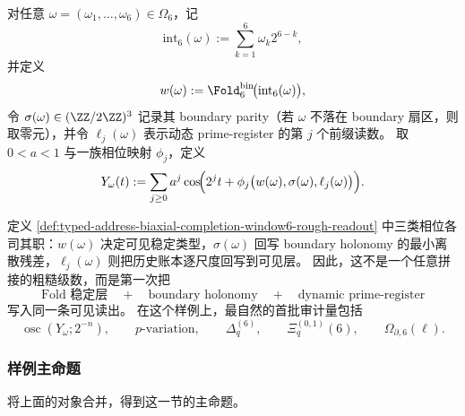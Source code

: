 \begin{definition}\label{def:typed-address-biaxial-completion-window6-rough-readout}
对任意 \(\omega=(\omega_1,\dots,\omega_6)\in\Omega_6\)，记
\[
\mathrm{int}_6(\omega):=\sum_{k=1}^{6}\omega_k2^{6-k},
\]
并定义
\[
w(\omega):=\Fold_6^{\mathrm{bin}}\!\bigl(\mathrm{int}_6(\omega)\bigr),
\]
令 \(\sigma(\omega)\in (\ZZ/2\ZZ)^3\) 记录其 boundary parity（若 \(\omega\) 不落在 boundary 扇区，则取零元），并令 \(\ell_j(\omega)\) 表示动态 prime-register 的第 \(j\) 个前缀读数。
取 \(0<a<1\) 与一族相位映射 \(\phi_j\)，定义
\[
Y_\omega(t)
:=
\sum_{j\ge 0}
a^j
\cos\!\Bigl(
2^j t+\phi_j\bigl(w(\omega),\sigma(\omega),\ell_j(\omega)\bigr)
\Bigr).
\]
\end{definition}

定义 \ref{def:typed-address-biaxial-completion-window6-rough-readout} 中三类相位各司其职：\(w(\omega)\) 决定可见稳定类型，\(\sigma(\omega)\) 回写 boundary holonomy 的最小离散残差，\(\ell_j(\omega)\) 则把历史账本逐尺度回写到可见层。
因此，这不是一个任意拼接的粗糙级数，而是第一次把
\[
\text{Fold 稳定层}
\quad+\quad
\text{boundary holonomy}
\quad+\quad
\text{dynamic prime-register}
\]
写入同一条可见读出。
在这个样例上，最自然的首批审计量包括
\[
\operatorname{osc}(Y_\omega;2^{-n}),
\qquad
\text{\(p\)-variation},
\qquad
\Delta_q^{(6)},
\qquad
\Xi_q^{(0,1)}(6),
\qquad
\Omega_{\partial,6}(\ell).
\]

\subsubsection{样例主命题}\label{subsubsec:typed-address-biaxial-completion-window6-example-main}
将上面的对象合并，得到这一节的主命题。

